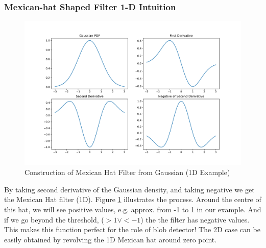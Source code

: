 \documentclass[11pt]{article}
\begin{document}
\subsubsection{Mexican-hat Shaped Filter 1-D Intuition}
\begin{figure}
	\center\includegraphics[width=\textwidth]{figs/mexican_hat_gaussian}
	\caption{Construction of Mexican Hat Filter from Gaussian (1D Example)\label{fig:mexicanhat}}
\end{figure}
By taking second derivative of the Gaussian density, and taking negative we get the Mexican Hat filter (1D). Figure \ref{fig:mexicanhat} illustrates the process. Around the centre of this hat, we will see positive values, e.g. approx. from -1 to 1 in our example. And if we go beyond the threshold, ($> 1 \vee < -1$) the the filter has negative values. This makes this function perfect for the role of blob detector! The 2D case can be easily obtained by revolving the 1D Mexican hat around zero point. 
\end{document}
